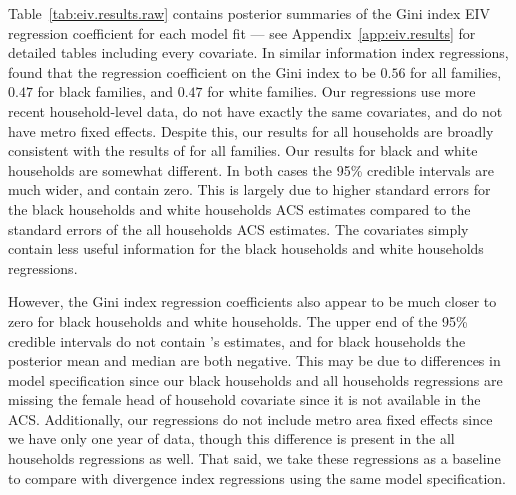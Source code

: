 \documentclass[12pt]{article}
\begin{document}
Table~\ref{tab:eiv.results.raw} contains posterior summaries of the Gini index EIV regression coefficient for each model fit --- see Appendix~\ref{app:eiv.results} for detailed tables including every covariate. In similar information index regressions, \citet[Table 4]{reardon2011income} found that the regression coefficient on the Gini index to be $0.56$ for all families, $0.47$ for black families, and $0.47$ for white families. Our regressions use more recent household-level data, do not have exactly the same covariates, and do not have metro fixed effects. Despite this, our results for all households are broadly consistent with the results of \citet{reardon2011income} for all families. Our results for black and white households are somewhat different. In both cases the 95\% credible intervals are much wider, and contain zero. This is largely due to higher standard errors for the black households and white households ACS estimates compared to the standard errors of the all households ACS estimates. The covariates simply contain less useful information for the black households and white households regressions.

However, the Gini index regression coefficients also appear to be much closer to zero for black households and white households. The upper end of the 95\% credible intervals do not contain \citet{reardon2011income}'s estimates, and for black households the posterior mean and median are both negative. This may be due to differences in model specification since our black households and all households regressions are missing the female head of household covariate since it is not available in the ACS. Additionally, our regressions do not include metro area fixed effects since we have only one year of data, though this difference is present in the all households regressions as well. That said, we take these regressions as a baseline to compare with divergence index regressions using the same model specification.
\end{document}

